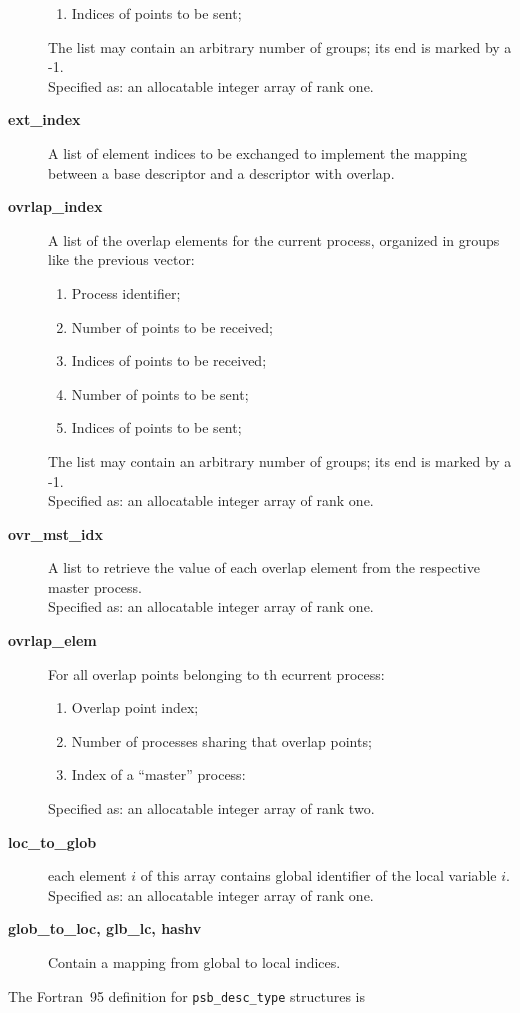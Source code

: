 \begin{description}
\begin{enumerate}
\item Indices of points to be sent;
\end{enumerate}
The list may contain an arbitrary number of groups; its end is marked
by a -1.\\
Specified as: an allocatable integer array of rank one.
\item[{\bf ext\_index}] A list of element indices to be exchanged to
  implement the mapping between a base descriptor and a descriptor
  with overlap. 
\item [{\bf ovrlap\_index}] A list of the overlap elements for the
current process, organized in groups like the previous vector:
\begin{enumerate}
\item Process identifier;
\item Number of points to be received;
\item Indices of points to be received;
\item Number of points to be sent;
\item Indices of points to be sent;
\end{enumerate}
The list may contain an arbitrary number of groups; its end is marked
by a -1.\\
Specified as: an allocatable integer array  of rank one.
\item [{\bf ovr\_mst\_idx}] A list to retrieve the value of each
  overlap element from the respective master process.\\
Specified as: an allocatable integer array of rank one.
\item [{\bf ovrlap\_elem}] For all overlap points belonging to th
ecurrent process:
\begin{enumerate}
\item Overlap point index;
\item Number of processes sharing that overlap points;
\item Index of a ``master'' process: 
\end{enumerate}
Specified as: an allocatable integer array of rank two.
\item[{\bf loc\_to\_glob}] each element $i$ of this array contains
global identifier of the local variable $i$.\\
Specified as: an allocatable integer array of rank one.
\item[{\bf glob\_to\_loc, glb\_lc, hashv}] Contain a mapping from
  global to local indices. 
\end{description}
The Fortran~95 definition  for \verb|psb_desc_type| structures is 

